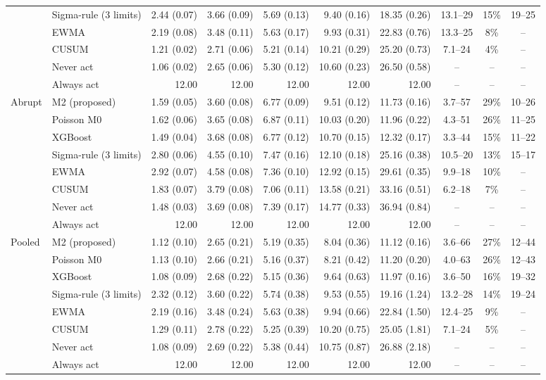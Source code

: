 \documentclass[10pt,a4paper]{article}
\begin{document}
{\begin{tabular}{llrrrrrccc}
 & Sigma-rule (3 limits) & 2.44 (0.07) & 3.66 (0.09) & 5.69 (0.13) & 9.40 (0.16) & 18.35 (0.26) & 13.1--29 & 15\% & 19--25 \\
 & EWMA & 2.19 (0.08) & 3.48 (0.11) & 5.63 (0.17) & 9.93 (0.31) & 22.83 (0.76) & 13.3--25 & 8\% & -- \\
 & CUSUM & 1.21 (0.02) & 2.71 (0.06) & 5.21 (0.14) & 10.21 (0.29) & 25.20 (0.73) & 7.1--24 & 4\% & -- \\
 & Never act & 1.06 (0.02) & 2.65 (0.06) & 5.30 (0.12) & 10.60 (0.23) & 26.50 (0.58) & -- & -- & -- \\
 & Always act & 12.00 & 12.00 & 12.00 & 12.00 & 12.00 & -- & -- & -- \\
\addlinespace
Abrupt & M2 (proposed) & 1.59 (0.05) & 3.60 (0.08) & 6.77 (0.09) & 9.51 (0.12) & 11.73 (0.16) & 3.7--57 & 29\% & 10--26 \\
 & Poisson M0 & 1.62 (0.06) & 3.65 (0.08) & 6.87 (0.11) & 10.03 (0.20) & 11.96 (0.22) & 4.3--51 & 26\% & 11--25 \\
 & XGBoost & 1.49 (0.04) & 3.68 (0.08) & 6.77 (0.12) & 10.70 (0.15) & 12.32 (0.17) & 3.3--44 & 15\% & 11--22 \\
 & Sigma-rule (3 limits) & 2.80 (0.06) & 4.55 (0.10) & 7.47 (0.16) & 12.10 (0.18) & 25.16 (0.38) & 10.5--20 & 13\% & 15--17 \\
 & EWMA & 2.92 (0.07) & 4.58 (0.08) & 7.36 (0.10) & 12.92 (0.15) & 29.61 (0.35) & 9.9--18 & 10\% & -- \\
 & CUSUM & 1.83 (0.07) & 3.79 (0.08) & 7.06 (0.11) & 13.58 (0.21) & 33.16 (0.51) & 6.2--18 & 7\% & -- \\
 & Never act & 1.48 (0.03) & 3.69 (0.08) & 7.39 (0.17) & 14.77 (0.33) & 36.94 (0.84) & -- & -- & -- \\
 & Always act & 12.00 & 12.00 & 12.00 & 12.00 & 12.00 & -- & -- & -- \\
\addlinespace
Pooled & M2 (proposed) & 1.12 (0.10) & 2.65 (0.21) & 5.19 (0.35) & 8.04 (0.36) & 11.12 (0.16) & 3.6--66 & 27\% & 12--44 \\
 & Poisson M0 & 1.13 (0.10) & 2.66 (0.21) & 5.16 (0.37) & 8.21 (0.42) & 11.20 (0.20) & 4.0--63 & 26\% & 12--43 \\
 & XGBoost & 1.08 (0.09) & 2.68 (0.22) & 5.15 (0.36) & 9.64 (0.63) & 11.97 (0.16) & 3.6--50 & 16\% & 19--32 \\
 & Sigma-rule (3 limits) & 2.32 (0.12) & 3.60 (0.22) & 5.74 (0.38) & 9.53 (0.55) & 19.16 (1.24) & 13.2--28 & 14\% & 19--24 \\
 & EWMA & 2.19 (0.16) & 3.48 (0.24) & 5.63 (0.38) & 9.94 (0.66) & 22.84 (1.50) & 12.4--25 & 9\% & -- \\
 & CUSUM & 1.29 (0.11) & 2.78 (0.22) & 5.25 (0.39) & 10.20 (0.75) & 25.05 (1.81) & 7.1--24 & 5\% & -- \\
 & Never act & 1.08 (0.09) & 2.69 (0.22) & 5.38 (0.44) & 10.75 (0.87) & 26.88 (2.18) & -- & -- & -- \\
 & Always act & 12.00 & 12.00 & 12.00 & 12.00 & 12.00 & -- & -- & -- \\
\bottomrule
\end{tabular}

}
\end{document}
